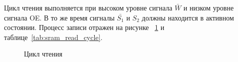 Цикл чтения выполняется при высоком уровне сигнала $\bar{W}$ и низком уровне сигнала OE. В то же время сигналы
$\bar{S_1}$ и ${S_2}$ должны находится в активном состоянии. Процесс записи отражен на рисунке ~\ref{pic:sram_read_cycle} и таблице~\ref{tab:sram_read_cycle}.

\begin{figure}[h]
\caption{Цикл чтения}
\label{pic:sram_read_cycle}
\end{figure}

